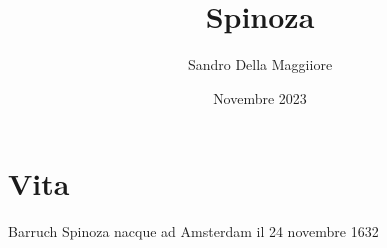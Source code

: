 \documentclass[a4paper,12pt,notitlepage]{report}
\begin{document}
	\author{Sandro Della Maggiiore}
	\title{Spinoza}
	\date{Novembre 2023}
	\maketitle
	
	\chapter*{Vita}
	
	
	Barruch Spinoza nacque ad Amsterdam il 24 novembre 1632
	
	
	
\end{document}
